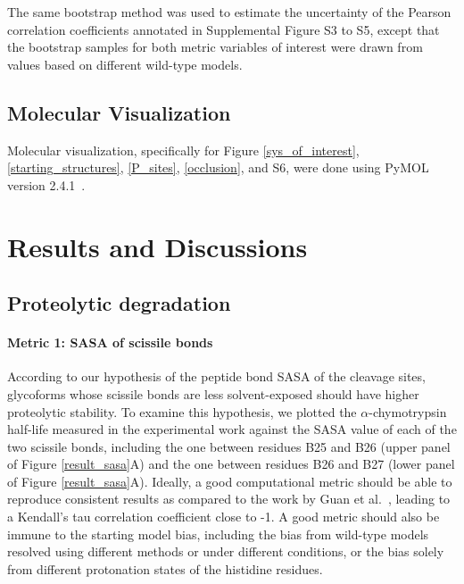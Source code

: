 \documentclass[9pt]{elife}
\begin{document}
The same bootstrap method was used to estimate the uncertainty of the Pearson correlation coefficients annotated in Supplemental Figure S3 to S5, except that the bootstrap samples for both metric variables of interest were drawn from values based on different wild-type models.

\subsection{Molecular Visualization}
Molecular visualization, specifically for Figure \ref{sys_of_interest}, \ref{starting_structures}, \ref{P_sites}, \ref{occlusion}, and S6, were done using PyMOL version 2.4.1~\cite{delano2002pymol}.

\section{Results and Discussions}\label{results}
\subsection{Proteolytic degradation}
\paragraph{Metric 1: SASA of scissile bonds}
According to our hypothesis of the peptide bond SASA of the cleavage sites, glycoforms whose scissile bonds are less solvent-exposed should have higher proteolytic stability. To examine this hypothesis, we plotted the $\alpha$-chymotrypsin half-life measured in the experimental work against the SASA value of each of the two scissile bonds, including the one between residues B25 and B26 (upper panel of Figure \ref{result_sasa}A) and the one between residues B26 and B27 (lower panel of Figure \ref{result_sasa}A). Ideally, a good computational metric should be able to reproduce consistent results as compared to the work by Guan et al.~\cite{guan2018chemically}, leading to a Kendall's tau correlation coefficient close to -1. A good metric should also be immune to the starting model bias, including the bias from wild-type models resolved using different methods or under different conditions, or the bias solely from different protonation states of the histidine residues. 
\end{document}
